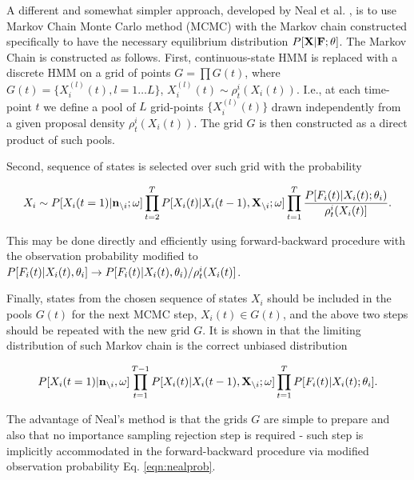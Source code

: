 A different and somewhat simpler approach, developed by Neal et al. \cite{NBR03}, is to use Markov Chain Monte Carlo method (MCMC) with the Markov chain constructed specifically to have the necessary equilibrium distribution $P[{\bf X}| {\bf F}; \theta]$. The Markov Chain is constructed as follows. First, continuous-state HMM is replaced with a discrete HMM on a grid of points $G=\prod G(t)$, where $G(t) = \{X_i^{(l)}(t), l=1\ldots L\}$, $X_i^{(l)}(t)\sim \rho^i_t(X_i(t))$. I.e., at each time-point $t$ we define a pool of $L$ grid-points $\{X_i^{(l)}(t)\}$ drawn independently from a given proposal density $\rho^i_t(X_i(t))$. The grid $G$ is then constructed as a direct product of such pools.

Second, sequence of states is selected over such grid with the probability

\begin{equation}\label{eqn:nealprob}
X_i\sim P[X_i(t=1)|{\bf n}_{\backslash i}; \mathbf{\omega}]\prod\limits_{t=2}^{T}P[X_i(t)|X_i(t-1), {\bf X}_{\backslash i}; \mathbf{\omega}] \prod\limits_{t=1}^{T}
\frac{P[F_i(t)|X_i(t); \mathbf{\theta}_i)}{\rho^i_t(X_i(t)]}.
\end{equation}

This may be done directly and efficiently using forward-backward procedure with the observation probability modified to $P[F_i(t)|X_i(t), \mathbf{\theta}_i]\rightarrow P[F_i(t)|X_i(t), \mathbf{\theta}_i)/{\rho^i_t(X_i(t)]}$.

Finally, states from the chosen sequence of states $X_i$ should be included in the pools $G(t)$ for the next MCMC step, $X_i(t)\in G(t)$, and the above two steps should be repeated with the new grid $G$. It is shown in \cite{NBR03} that the limiting distribution of such Markov chain is the correct unbiased distribution

\begin{equation}
P[X_i(t=1)|{\bf n}_{\backslash i}, \mathbf{\omega}]\prod\limits_{t=1}^{T-1}P[X_i(t)|X_i(t-1), {\bf X}_{\backslash i}; \mathbf{\omega}]\prod\limits_{t=1}^{T}P[F_i(t)|X_i(t); \mathbf{\theta}_i].
\end{equation}

The advantage of Neal's method is that the grids $G$ are simple to prepare and also that no importance sampling rejection step is required - such step is implicitly accommodated in the forward-backward procedure via modified observation probability Eq. \eqref{eqn:nealprob}.

